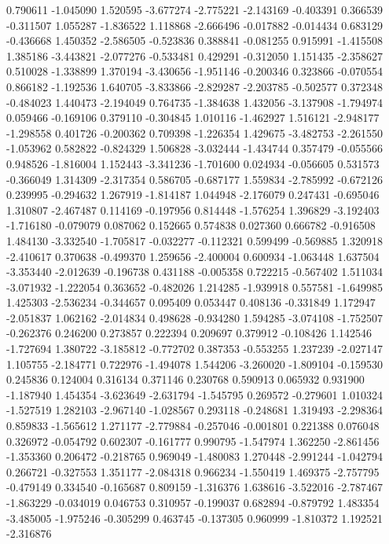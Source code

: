 0.790611
-1.045090
1.520595
-3.677274
-2.775221
-2.143169
-0.403391
0.366539
-0.311507
1.055287
-1.836522
1.118868
-2.666496
-0.017882
-0.014434
0.683129
-0.436668
1.450352
-2.586505
-0.523836
0.388841
-0.081255
0.915991
-1.415508
1.385186
-3.443821
-2.077276
-0.533481
0.429291
-0.312050
1.151435
-2.358627
0.510028
-1.338899
1.370194
-3.430656
-1.951146
-0.200346
0.323866
-0.070554
0.866182
-1.192536
1.640705
-3.833866
-2.829287
-2.203785
-0.502577
0.372348
-0.484023
1.440473
-2.194049
0.764735
-1.384638
1.432056
-3.137908
-1.794974
0.059466
-0.169106
0.379110
-0.304845
1.010116
-1.462927
1.516121
-2.948177
-1.298558
0.401726
-0.200362
0.709398
-1.226354
1.429675
-3.482753
-2.261550
-1.053962
0.582822
-0.824329
1.506828
-3.032444
-1.434744
0.357479
-0.055566
0.948526
-1.816004
1.152443
-3.341236
-1.701600
0.024934
-0.056605
0.531573
-0.366049
1.314309
-2.317354
0.586705
-0.687177
1.559834
-2.785992
-0.672126
0.239995
-0.294632
1.267919
-1.814187
1.044948
-2.176079
0.247431
-0.695046
1.310807
-2.467487
0.114169
-0.197956
0.814448
-1.576254
1.396829
-3.192403
-1.716180
-0.079079
0.087062
0.152665
0.574838
0.027360
0.666782
-0.916508
1.484130
-3.332540
-1.705817
-0.032277
-0.112321
0.599499
-0.569885
1.320918
-2.410617
0.370638
-0.499370
1.259656
-2.400004
0.600934
-1.063448
1.637504
-3.353440
-2.012639
-0.196738
0.431188
-0.005358
0.722215
-0.567402
1.511034
-3.071932
-1.222054
0.363652
-0.482026
1.214285
-1.939918
0.557581
-1.649985
1.425303
-2.536234
-0.344657
0.095409
0.053447
0.408136
-0.331849
1.172947
-2.051837
1.062162
-2.014834
0.498628
-0.934280
1.594285
-3.074108
-1.752507
-0.262376
0.246200
0.273857
0.222394
0.209697
0.379912
-0.108426
1.142546
-1.727694
1.380722
-3.185812
-0.772702
0.387353
-0.553255
1.237239
-2.027147
1.105755
-2.184771
0.722976
-1.494078
1.544206
-3.260020
-1.809104
-0.159530
0.245836
0.124004
0.316134
0.371146
0.230768
0.590913
0.065932
0.931900
-1.187940
1.454354
-3.623649
-2.631794
-1.545795
0.269572
-0.279601
1.010324
-1.527519
1.282103
-2.967140
-1.028567
0.293118
-0.248681
1.319493
-2.298364
0.859833
-1.565612
1.271177
-2.779884
-0.257046
-0.001801
0.221388
0.076048
0.326972
-0.054792
0.602307
-0.161777
0.990795
-1.547974
1.362250
-2.861456
-1.353360
0.206472
-0.218765
0.969049
-1.480083
1.270448
-2.991244
-1.042794
0.266721
-0.327553
1.351177
-2.084318
0.966234
-1.550419
1.469375
-2.757795
-0.479149
0.334540
-0.165687
0.809159
-1.316376
1.638616
-3.522016
-2.787467
-1.863229
-0.034019
0.046753
0.310957
-0.199037
0.682894
-0.879792
1.483354
-3.485005
-1.975246
-0.305299
0.463745
-0.137305
0.960999
-1.810372
1.192521
-2.316876
